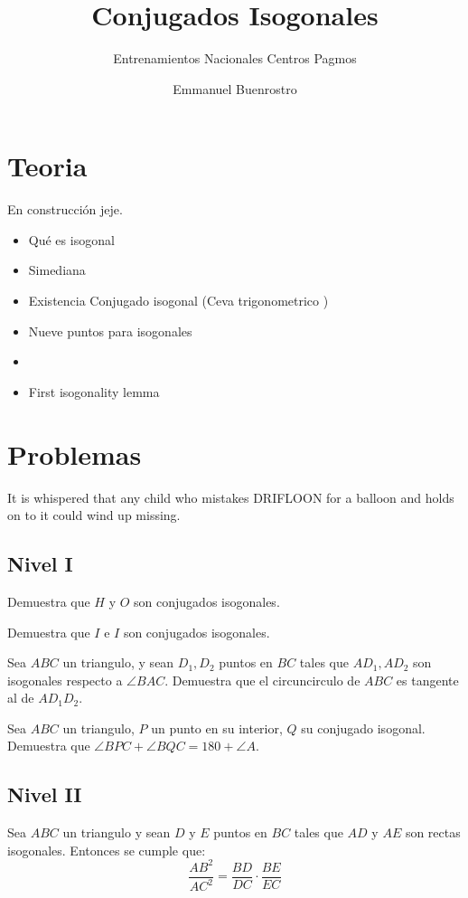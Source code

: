 \documentclass[11pt]{scrartcl}
\title {Conjugados Isogonales}
\subtitle {Entrenamientos Nacionales Centros Pagmos}
\author{Emmanuel Buenrostro}
\begin{document}
\maketitle

\section{Teoria}

En construcción jeje.

\begin{itemize}
    \item Qué es isogonal 
    \item Simediana
    \item Existencia Conjugado isogonal (Ceva trigonometrico )
    \item Nueve puntos para isogonales
    \item 
    \item First isogonality lemma
\end{itemize}

\section{Problemas}
\epigraph{It is whispered that any child who mistakes DRIFLOON for a balloon and holds on to it could wind up missing.}{ }

\subsection{Nivel I}
\begin{problem}
    Demuestra que $H$ y $O$ son conjugados isogonales.
\end{problem}

\begin{problem}
    Demuestra que $I$ e $I$ son conjugados isogonales.
\end{problem}
\begin{problem}
    Sea $ABC$ un triangulo, y sean $D_1,D_2$ puntos en $BC$ tales que $AD_1,AD_2$ son isogonales respecto a $\angle BAC$. Demuestra que el circuncirculo de $ABC$ es tangente al de $AD_1D_2$.
\end{problem}

\begin{problem}
    Sea $ABC$ un triangulo, $P$ un punto en su interior, $Q$ su conjugado isogonal. Demuestra que $\angle BPC +\angle BQC =180+\angle A$.
\end{problem}
\subsection{Nivel II}
\begin{problem} %
Sea $ABC$ un triangulo y sean $D$ y $E$ puntos en $BC$ tales que $AD$ y $AE$ son rectas isogonales. Entonces se cumple que: 
\[\frac{AB^2}{AC^2}=\frac{BD}{DC} \cdot \frac{BE}{EC}\]
\end{problem}
\end{document}
